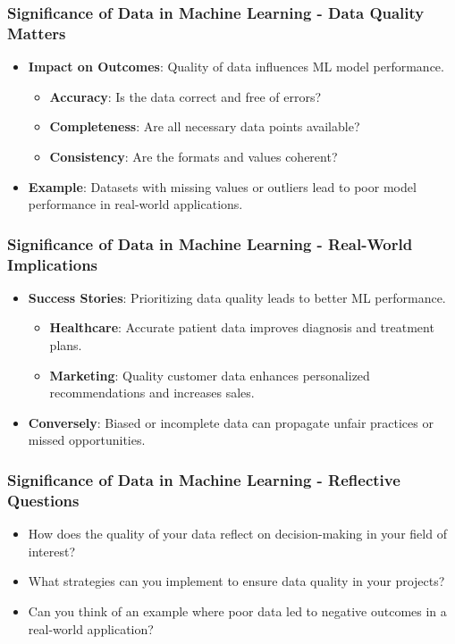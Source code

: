 \documentclass[aspectratio=169]{beamer}
\begin{document}
\begin{frame}[fragile]
    \frametitle{Significance of Data in Machine Learning - Data Quality Matters}
    \begin{itemize}
        \item \textbf{Impact on Outcomes}: Quality of data influences ML model performance.
        \begin{itemize}
            \item \textbf{Accuracy}: Is the data correct and free of errors?
            \item \textbf{Completeness}: Are all necessary data points available?
            \item \textbf{Consistency}: Are the formats and values coherent?
        \end{itemize}
        \item \textbf{Example}: Datasets with missing values or outliers lead to poor model performance in real-world applications.
    \end{itemize}
\end{frame}

\begin{frame}[fragile]
    \frametitle{Significance of Data in Machine Learning - Real-World Implications}
    \begin{itemize}
        \item \textbf{Success Stories}: Prioritizing data quality leads to better ML performance.
        \begin{itemize}
            \item \textbf{Healthcare}: Accurate patient data improves diagnosis and treatment plans.
            \item \textbf{Marketing}: Quality customer data enhances personalized recommendations and increases sales.
        \end{itemize}
        \item \textbf{Conversely}: Biased or incomplete data can propagate unfair practices or missed opportunities.
    \end{itemize}
\end{frame}

\begin{frame}[fragile]
    \frametitle{Significance of Data in Machine Learning - Reflective Questions}
    \begin{itemize}
        \item How does the quality of your data reflect on decision-making in your field of interest?
        \item What strategies can you implement to ensure data quality in your projects?
        \item Can you think of an example where poor data led to negative outcomes in a real-world application?
    \end{itemize}
\end{frame}
\end{document}
